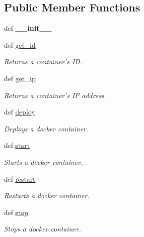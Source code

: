 \subsection*{Public Member Functions}
\begin{DoxyCompactItemize}
\item 
\hypertarget{classhypervisor_1_1docker__driver_1_1DockerDriver_a0b9311d90850a8a145c2961654867f98}{def {\bfseries \-\_\-\-\_\-init\-\_\-\-\_\-}}\label{classhypervisor_1_1docker__driver_1_1DockerDriver_a0b9311d90850a8a145c2961654867f98}

\item 
def \hyperlink{classhypervisor_1_1docker__driver_1_1DockerDriver_aedbd13cb76524d01894fcae539444f1b}{get\-\_\-id}
\begin{DoxyCompactList}\small\item\em Returns a container's I\-D. \end{DoxyCompactList}\item 
def \hyperlink{classhypervisor_1_1docker__driver_1_1DockerDriver_a56041a2a0afad5971b1fb5cb465b6ff6}{get\-\_\-ip}
\begin{DoxyCompactList}\small\item\em Returns a container's I\-P address. \end{DoxyCompactList}\item 
def \hyperlink{classhypervisor_1_1docker__driver_1_1DockerDriver_a9b0a6af05425f986bdc54495e9bd62c5}{deploy}
\begin{DoxyCompactList}\small\item\em Deploys a docker container. \end{DoxyCompactList}\item 
def \hyperlink{classhypervisor_1_1docker__driver_1_1DockerDriver_afe2784b21c6ef7dbe01b1188a31e9444}{start}
\begin{DoxyCompactList}\small\item\em Starts a docker container. \end{DoxyCompactList}\item 
def \hyperlink{classhypervisor_1_1docker__driver_1_1DockerDriver_abbb36db4303f0613d9013f3c2b9bfe84}{restart}
\begin{DoxyCompactList}\small\item\em Restarts a docker container. \end{DoxyCompactList}\item 
def \hyperlink{classhypervisor_1_1docker__driver_1_1DockerDriver_ab88257e3bc4660c62cd070f8de62e5a6}{stop}
\begin{DoxyCompactList}\small\item\em Stops a docker container. \end{DoxyCompactList}\item 

\end{DoxyCompactItemize}
